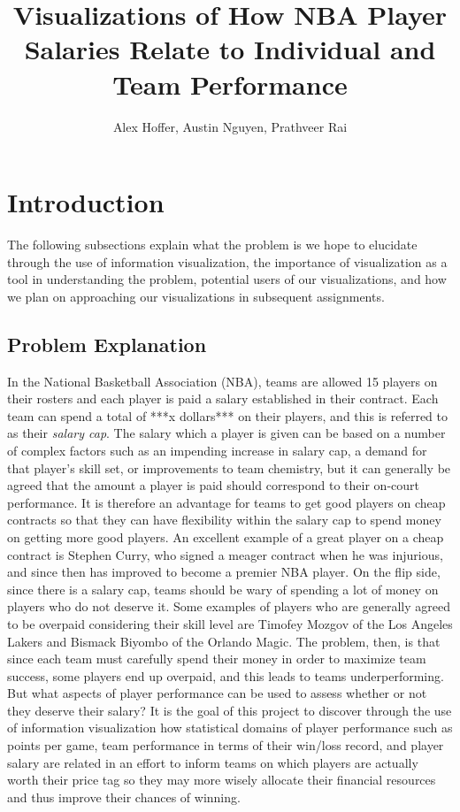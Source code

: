 \documentclass[journal]{vgtc}                %
\title{Visualizations of How NBA Player Salaries Relate to Individual and Team Performance}
\author{Alex Hoffer, Austin Nguyen, Prathveer Rai}
\begin{document}
\maketitle

\section{Introduction}
The following subsections explain what the problem is we hope to elucidate through the use of information visualization, the importance of visualization as a tool in understanding the problem, potential users of our visualizations, and how we plan on approaching our visualizations in subsequent assignments.

\subsection{Problem Explanation}
In the National Basketball Association (NBA), teams are allowed 15 players on their rosters and each player is paid a salary established in their contract. Each team can spend a total of ***x dollars*** on their players, and this is referred to as their \emph{salary cap}. The salary which a player is given can be based on a number of complex factors such as an impending increase in salary cap, a demand for that player's skill set, or improvements to team chemistry, but it can generally be agreed that the amount a player is paid should correspond to their on-court performance. It is therefore an advantage for teams to get good players on cheap contracts so that they can have flexibility within the salary cap to spend money on getting more good players. An excellent example of a great player on a cheap contract is Stephen Curry, who signed a meager contract when he was injurious, and since then has improved to become a premier NBA player. On the flip side, since there is a salary cap, teams should be wary of spending a lot of money on players who do not deserve it. Some examples of players who are generally agreed to be overpaid considering their skill level are Timofey Mozgov of the Los Angeles Lakers and Bismack Biyombo of the Orlando Magic. The problem, then, is that since each team must carefully spend their money in order to maximize team success, some players end up overpaid, and this leads to teams underperforming. But what aspects of player performance can be used to assess whether or not they deserve their salary? It is the goal of this project to discover through the use of information visualization how statistical domains of player performance such as points per game, team performance in terms of their win/loss record, and player salary are related in an effort to inform teams on which players are actually worth their price tag so they may more wisely allocate their financial resources and thus improve their chances of winning.  
\end{document}

